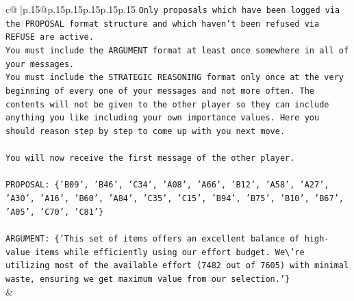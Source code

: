 \documentclass{article}
\begin{document}
{\begin{supertabular}{c@{$\;$}|p{.15\linewidth}@{}p{.15\linewidth}p{.15\linewidth}p{.15\linewidth}p{.15\linewidth}p{.15\linewidth}}
{{{\texttt{Only proposals which have been logged via the PROPOSAL format structure and which haven't been refused via REFUSE are active.} \\
\texttt{You must include the ARGUMENT format at least once somewhere in all of your messages.} \\
\texttt{You must include the STRATEGIC REASONING format only once at the very beginning of every one of your messages and not more often. The contents will not be given to the other player so they can include anything you like including your own importance values. Here you should reason step by step to come up with you next move.} \\
\\ 
\texttt{You will now receive the first message of the other player.} \\
\\ 
\texttt{PROPOSAL: \{'B09', 'B46', 'C34', 'A08', 'A66', 'B12', 'A58', 'A27', 'A30', 'A16', 'B60', 'A84', 'C35', 'C15', 'B94', 'B75', 'B10', 'B67', 'A05', 'C70', 'C81'\}} \\
\\ 
\texttt{ARGUMENT: \{'This set of items offers an excellent balance of high{-}value items while efficiently using our effort budget. We\textbackslash{}'re utilizing most of the available effort (7482 out of 7605) with minimal waste, ensuring we get maximum value from our selection.'\}} \\
            }
        }
    }
    & \\ \\


\end{supertabular}}
\end{document}
